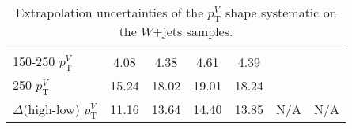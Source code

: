 \begin{table}[!htb]
{\begin{tabular}{lS[table-format=3.2]S[table-format=3.2]S[table-format=3.2]S[table-format=3.2]S[table-format=3.2]S[table-format=3.2]}
      150-250 $p_{\mathrm{T}}^V$              & 4.08  & 4.38  & 4.61  & 4.39  &    {}     & {} \\ 
      250 $p_{\mathrm{T}}^V$                  & 15.24 & 18.02 & 19.01 & 18.24 &               &              \\
      $\Delta$(high-low) $p_{\mathrm{T}}^V$   & 11.16 & 13.64 & 14.40 & 13.85 &     N/A          &      N/A  \\
      \bottomrule
    \end{tabular}
  }
  \caption{Extrapolation uncertainties of the $p_{\mathrm{T}}^V$ shape systematic on the
    $W$+jets samples.}
  \label{tab:wjets-extrapolation_uncertainties_pTV}
\end{table}